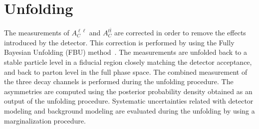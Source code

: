 \documentclass[12pt]{article}
\begin{document}
\section{Unfolding}
The measurements of $A_C^{\ell \ell}$ and  $A_C^{t\bar{t}}$ are corrected in order to remove the effects introduced by the detector. This correction is performed by using the Fully Bayesian Unfolding (FBU) method~\cite{fbu}. The measurements are unfolded back to a stable particle level in a fiducial region closely matching the detector acceptance, and back to parton level in the full phase space. The combined measurement of the three decay channels is performed during the unfolding procedure. The asymmetries are computed using the posterior probability density obtained as an output of the unfolding procedure. Systematic uncertainties related with detector modeling and background modeling are evaluated during the unfolding by using a marginalization procedure. 
\end{document}
